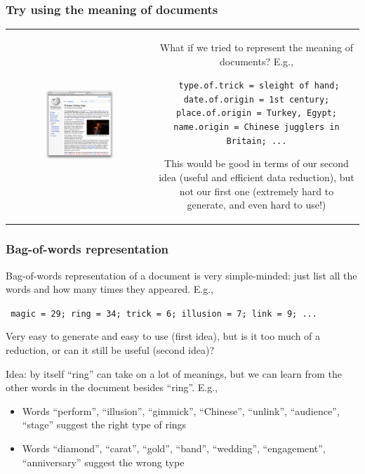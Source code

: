 \documentclass[mathserif]{beamer}
\def\red{\color[rgb]{0.8,0,0}}
\begin{document}
\begin{frame}
\frametitle{Try using the meaning of documents}
\begin{tabular}{cc}
\hspace{-15pt}
\parbox{0.5\textwidth}{
\includegraphics[width=0.5\textwidth]{wikipedia.png}} & 
\parbox{0.5\textwidth}{
What if we tried to represent the {\red meaning} of 
documents? E.g., 

\bigskip
{\footnotesize\tt 
type.of.trick = sleight of hand; \\
date.of.origin = 1st century; \\
place.of.origin = Turkey, Egypt; \\
name.origin = Chinese jugglers in Britain; ...}

\bigskip
This would be good in terms of our second idea 
(useful and efficient data reduction), but not our first
one ({\red extremely hard} to generate, 
and even hard to use!)}
\end{tabular}
\end{frame}

\begin{frame}
\frametitle{Bag-of-words representation}
{\red Bag-of-words} representation of 
a document is very simple-minded: just list all the words and 
how many times they appeared. E.g.,

\vspace{-5pt}
\begin{center}
{\footnotesize\tt
magic = 29; ring = 34; trick = 6; illusion = 7; link = 9; ...}
\end{center}

\vspace{-5pt}
Very easy to generate and easy to use (first idea),
but is it too much of a reduction, or can it still be useful 
(second idea)?

\bigskip
Idea: by itself ``ring'' can take on a 
lot of meanings, but we can learn from the {\red other words}
in the document besides ``ring''. E.g.,
\begin{itemize}
\item Words ``perform'', ``illusion'', ``gimmick'', 
``Chinese'', ``unlink'', ``audience'', ``stage'' 
suggest the right type of rings
\item Words ``diamond'', ``carat'', ``gold'', 
``band'', ``wedding'', ``engagement'', ``anniversary''
suggest the wrong type 
\end{itemize}
\end{frame}
\end{document}
